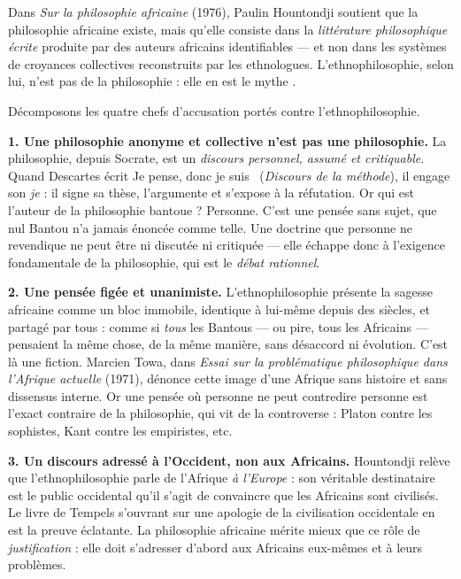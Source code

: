 \documentclass[11pt]{article}
\begin{document}
\begin{propriete}
Dans \emph{Sur la \guillemotleft philosophie africaine \guillemotright} (1976), Paulin Hountondji soutient que la philosophie africaine existe, mais qu'elle consiste dans la \emph{littérature philosophique écrite} produite par des auteurs africains identifiables — et non dans les systèmes de croyances collectives reconstruits par les ethnologues. L'ethnophilosophie, selon lui, n'est pas de la philosophie : elle en est le \guillemotleft mythe \guillemotright.
\end{propriete}

Décomposons les quatre chefs d'accusation portés contre l'ethnophilosophie.

\textbf{1. Une philosophie anonyme et collective n'est pas une philosophie.} La philosophie, depuis Socrate, est un \emph{discours personnel, assumé et critiquable}. Quand Descartes écrit \guillemotleft Je pense, donc je suis \guillemotright\ (\emph{Discours de la méthode}), il engage son \emph{je} : il signe sa thèse, l'argumente et s'expose à la réfutation. Or qui est l'auteur de la \guillemotleft philosophie bantoue \guillemotright ? Personne. C'est une pensée sans sujet, que nul Bantou n'a jamais énoncée comme telle. Une doctrine que personne ne revendique ne peut être ni discutée ni critiquée — elle échappe donc à l'exigence fondamentale de la philosophie, qui est le \emph{débat rationnel}.

\textbf{2. Une pensée figée et unanimiste.} L'ethnophilosophie présente la sagesse africaine comme un bloc immobile, identique à lui-même depuis des siècles, et partagé par tous : comme si \emph{tous} les Bantous — ou pire, tous les Africains — pensaient la même chose, de la même manière, sans désaccord ni évolution. C'est là une fiction. Marcien Towa, dans \emph{Essai sur la problématique philosophique dans l'Afrique actuelle} (1971), dénonce cette image d'une Afrique sans histoire et sans dissensus interne. Or une pensée où personne ne peut contredire personne est l'exact contraire de la philosophie, qui vit de la controverse : Platon contre les sophistes, Kant contre les empiristes, etc.

\textbf{3. Un discours adressé à l'Occident, non aux Africains.} Hountondji relève que l'ethnophilosophie parle de l'Afrique \emph{à l'Europe} : son véritable destinataire est le public occidental qu'il s'agit de convaincre que les Africains sont civilisés. Le livre de Tempels s'ouvrant sur une apologie de la civilisation occidentale en est la preuve éclatante. La philosophie africaine mérite mieux que ce rôle de \emph{justification} : elle doit s'adresser d'abord aux Africains eux-mêmes et à leurs problèmes.
\end{document}
